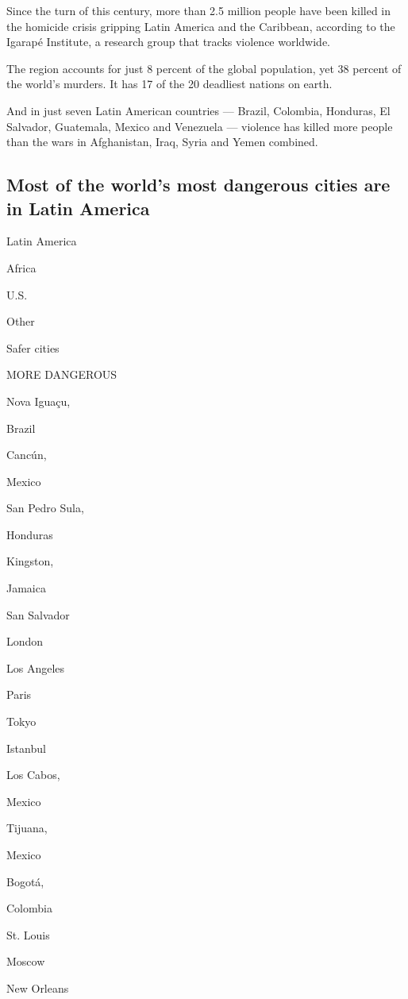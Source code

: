 Since the turn of this century, more than 2.5 million people have been
killed in the homicide crisis gripping Latin America and the Caribbean,
according to the Igarapé Institute, a research group that tracks
violence worldwide.

The region accounts for just 8 percent of the global population, yet 38
percent of the world's murders. It has 17 of the 20 deadliest nations on
earth.

And in just seven Latin American countries --- Brazil, Colombia,
Honduras, El Salvador, Guatemala, Mexico and Venezuela --- violence has
killed more people than the wars in Afghanistan, Iraq, Syria and Yemen
combined.

\hypertarget{most-of-the-worlds-most-dangerous-cities-are-in-latin-america}{%
\subsection{Most of the world's most dangerous cities are in Latin
America}\label{most-of-the-worlds-most-dangerous-cities-are-in-latin-america}}

Latin America

Africa

U.S.

Other

Safer cities

MORE DANGEROUS

Nova Iguaçu,

Brazil

Cancún,

Mexico

San Pedro Sula,

Honduras

Kingston,

Jamaica

San Salvador

London

Los Angeles

Paris

Tokyo

Istanbul

Los Cabos,

Mexico

Tijuana,

Mexico

Bogotá,

Colombia

St. Louis

Moscow

New Orleans

